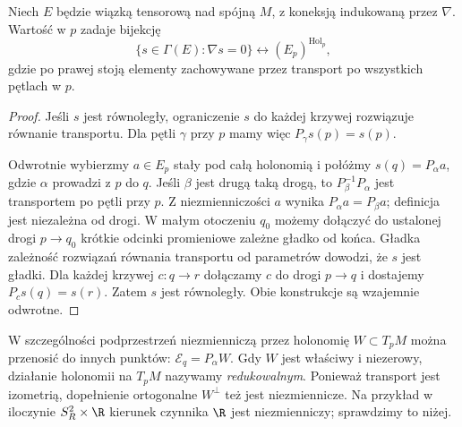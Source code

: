 \begin{stwierdzenie}
\label{prop:zasada-holonomii}
Niech $E$ będzie wiązką tensorową nad spójną $M$,
z koneksją indukowaną przez $\nabla$. Wartość w $p$
zadaje bijekcję
\[
 \{s\in\Gamma(E):\nabla s=0\}
 \longleftrightarrow (E_p)^{\operatorname{Hol}_p},
\]
gdzie po prawej stoją elementy zachowywane przez
transport po wszystkich pętlach w $p$.
\end{stwierdzenie}
\begin{proof}
Jeśli $s$ jest równoległy, ograniczenie $s$ do każdej
krzywej rozwiązuje równanie transportu. Dla pętli
$\gamma$ przy $p$ mamy więc $P_\gamma s(p)=s(p)$.

Odwrotnie wybierzmy $a\in E_p$ stały pod całą
holonomią i połóżmy $s(q)=P_\alpha a$, gdzie
$\alpha$ prowadzi z $p$ do $q$. Jeśli $\beta$ jest
drugą taką drogą, to $P_\beta^{-1}P_\alpha$
jest transportem po pętli przy $p$. Z niezmienniczości
$a$ wynika $P_\alpha a=P_\beta a$; definicja jest
niezależna od drogi. W małym otoczeniu $q_0$ możemy
dołączyć do ustalonej drogi $p\to q_0$ krótkie odcinki
promieniowe zależne gładko od końca. Gładka zależność
rozwiązań równania transportu od parametrów dowodzi,
że $s$ jest gładki. Dla każdej krzywej $c:q\to r$
dołączamy $c$ do drogi $p\to q$ i dostajemy
$P_c s(q)=s(r)$. Zatem $s$ jest równoległy.
Obie konstrukcje są wzajemnie odwrotne.
\end{proof}

W szczególności podprzestrzeń niezmienniczą przez holonomię
$W\subset T_pM$ można przenosić do innych punktów:
$\mathcal E_q=P_\alpha W$. Gdy $W$ jest właściwy
i niezerowy, działanie holonomii na $T_pM$ nazywamy
\emph{redukowalnym}. Ponieważ transport jest izometrią,
dopełnienie ortogonalne $W^\perp$ też jest niezmiennicze.
Na przykład w iloczynie $S_R^2\times\R$ kierunek
czynnika $\R$ jest niezmienniczy; sprawdzimy to niżej.

